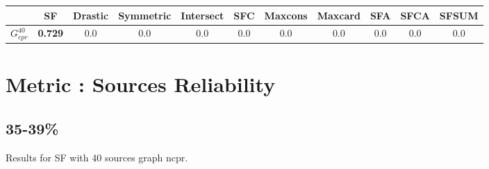 \documentclass{article}
\newcommand{\graph}[2]{$G_{#1}^{#2}$}
\begin{document}
\noindent\begin{tabular}{|l|c|c|c|c|c|c|c|c|c|c|}
\hline
& SF& Drastic& Symmetric& Intersect& SFC& Maxcons& Maxcard& SFA& SFCA& SFSUM\\
\hline
\graph{cpr}{40} &\textbf{0.729}&0.0&0.0&0.0&0.0&0.0&0.0&0.0&0.0&0.0\\
\hline
\end{tabular}
\newpage
\newpage
\section{Metric : Sources Reliability}

\newpage
\newpage

\subsection{35-39\%}

\noindent Results for SF with 40 sources graph ncpr.
\end{document}
